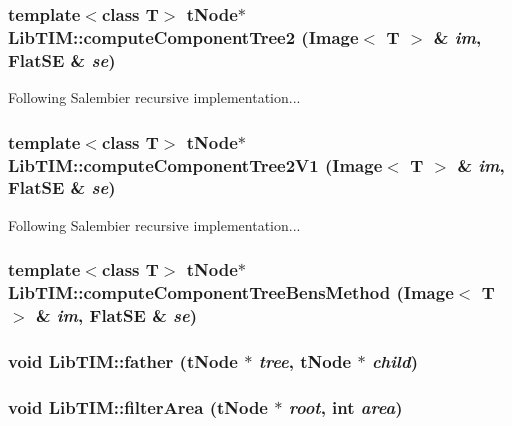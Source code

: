 \subsubsection{\setlength{\rightskip}{0pt plus 5cm}template$<$class T$>$ {\bf t\-Node}$\ast$ Lib\-TIM::compute\-Component\-Tree2 (Image$<$ T $>$ \& {\em im}, Flat\-SE \& {\em se})}\label{group__ccTree_ga13}


Following Salembier recursive implementation... 

\subsubsection{\setlength{\rightskip}{0pt plus 5cm}template$<$class T$>$ {\bf t\-Node}$\ast$ Lib\-TIM::compute\-Component\-Tree2V1 (Image$<$ T $>$ \& {\em im}, Flat\-SE \& {\em se})}\label{group__ccTree_ga12}


Following Salembier recursive implementation... 

\subsubsection{\setlength{\rightskip}{0pt plus 5cm}template$<$class T$>$ {\bf t\-Node}$\ast$ Lib\-TIM::compute\-Component\-Tree\-Bens\-Method (Image$<$ T $>$ \& {\em im}, Flat\-SE \& {\em se})}\label{group__ccTree_ga8}


\subsubsection{\setlength{\rightskip}{0pt plus 5cm}void Lib\-TIM::father ({\bf t\-Node} $\ast$ {\em tree}, {\bf t\-Node} $\ast$ {\em child})}\label{group__ccTree_ga6}


\subsubsection{\setlength{\rightskip}{0pt plus 5cm}void Lib\-TIM::filter\-Area ({\bf t\-Node} $\ast$ {\em root}, int {\em area})}\label{group__ccTree_ga0}


